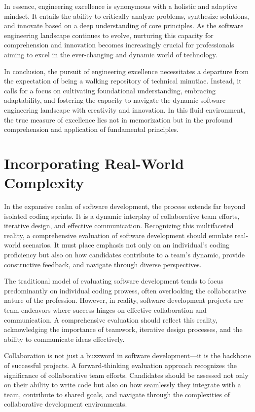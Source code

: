 \documentclass[
    a4paper, %
    10pt, %
    unnumberedsections, %
    twoside, %
]{LTJournalArticle}
\begin{document}
In essence, engineering excellence is synonymous with a holistic and adaptive mindset. It entails the ability to critically analyze problems, synthesize solutions, and innovate based on a deep understanding of core principles. As the software engineering landscape continues to evolve, nurturing this capacity for comprehension and innovation becomes increasingly crucial for professionals aiming to excel in the ever-changing and dynamic world of technology.

In conclusion, the pursuit of engineering excellence necessitates a departure from the expectation of being a walking repository of technical minutiae. Instead, it calls for a focus on cultivating foundational understanding, embracing adaptability, and fostering the capacity to navigate the dynamic software engineering landscape with creativity and innovation. In this fluid environment, the true measure of excellence lies not in memorization but in the profound comprehension and application of fundamental principles.

\section{Incorporating Real-World Complexity}

In the expansive realm of software development, the process extends far beyond isolated coding sprints. It is a dynamic interplay of collaborative team efforts, iterative design, and effective communication. Recognizing this multifaceted reality, a comprehensive evaluation of software development should emulate real-world scenarios. It must place emphasis not only on an individual's coding proficiency but also on how candidates contribute to a team's dynamic, provide constructive feedback, and navigate through diverse perspectives.

The traditional model of evaluating software development tends to focus predominantly on individual coding prowess, often overlooking the collaborative nature of the profession. However, in reality, software development projects are team endeavors where success hinges on effective collaboration and communication. A comprehensive evaluation should reflect this reality, acknowledging the importance of teamwork, iterative design processes, and the ability to communicate ideas effectively.

Collaboration is not just a buzzword in software development—it is the backbone of successful projects. A forward-thinking evaluation approach recognizes the significance of collaborative team efforts. Candidates should be assessed not only on their ability to write code but also on how seamlessly they integrate with a team, contribute to shared goals, and navigate through the complexities of collaborative development environments.
\end{document}
